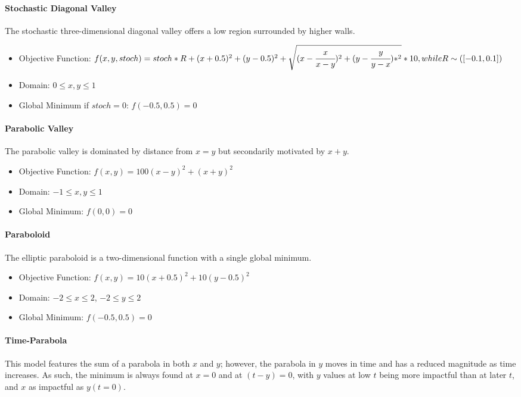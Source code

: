\paragraph{Stochastic Diagonal Valley}
The stochastic three-dimensional diagonal valley offers a low region surrounded by higher walls.

\begin{itemize}
  \item Objective Function: $f(x,y,stoch) = stoch * R + (x+0.5)^2 + (y-0.5)^2 + \sqrt{(x - \cfrac{x}{x-y})^2 + (y - \cfrac{y}{y-x})*^2} * 10, while R\sim ([-0.1,0.1])$
  \item Domain: $0 \leq x,y \leq 1$
  \item Global Minimum if $stoch =0$: $f(-0.5,0.5)=0$
\end{itemize}

\paragraph{Parabolic Valley}
The parabolic valley is dominated by distance from $x=y$ but secondarily motivated by $x+y$.

\begin{itemize}
  \item Objective Function: $f(x,y) = 100 (x - y)^2 + (x + y)^2$
  \item Domain: $-1 \leq x,y \leq 1$
  \item Global Minimum: $f(0,0)=0$
\end{itemize}

\paragraph{Paraboloid}
The elliptic paraboloid is a two-dimensional function with a single global minimum.

\begin{itemize}
  \item Objective Function: $f(x,y) = 10(x+0.5)^2 + 10(y-0.5)^2 $
  \item Domain: $-2 \leq x \leq 2$, $-2 \leq y \leq 2$
  \item Global Minimum: $f(-0.5,0.5) = 0$
\end{itemize}

\paragraph{Time-Parabola}
This model features the sum of a parabola in both $x$ and $y$; however, the parabola in $y$ moves in time and
has a reduced magnitude as time increases. As such, the minimum is always found at $x=0$ and at $(t-y)=0$, with
$y$ values at low $t$ being more impactful than at later $t$, and $x$ as impactful as $y(t=0)$.


